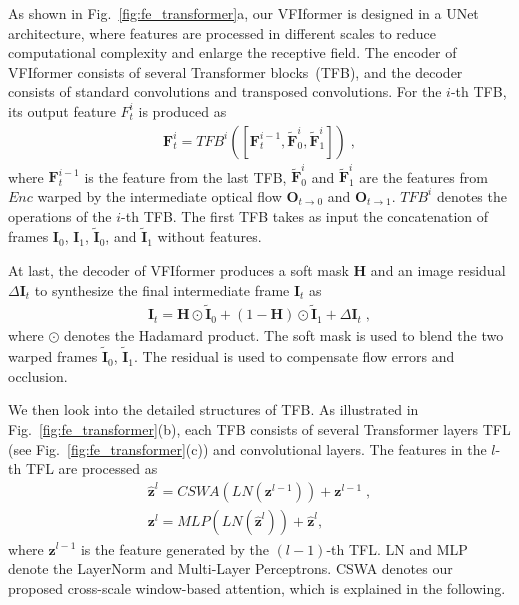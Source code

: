\documentclass[10pt,twocolumn,letterpaper]{article}
\begin{document}
	As shown in Fig.~\ref{fig:fe_transformer}a, our VFIformer is designed in a UNet architecture, where features are processed in different scales to reduce computational complexity and enlarge the receptive field.
	The encoder of VFIformer consists of several Transformer blocks~(TFB), and the decoder consists of standard convolutions and transposed convolutions.
	For the $i$-th TFB, its output feature $F_t^i$ is produced as
	\begin{align}
	\bm{F}_t^i = {TFB}^{i}([\bm{F}_t^{i-1}, \widetilde{\bm{F}}_{0}^{i}, \widetilde{\bm{F}}_{1}^{i}]) \;,
	\end{align}
	where $\bm{F}_t^{i-1}$ is the feature from the last TFB, $\widetilde{\bm{F}}_{0}^{i}$ and $\widetilde{\bm{F}}_{1}^{i}$ are the features from $Enc$ warped by the intermediate optical flow $\bm{O}_{t\rightarrow0}$ and $\bm{O}_{t\rightarrow1}$. ${TFB}^{i}$ denotes the operations of the $i$-th TFB. The first TFB takes as input the concatenation of frames $\bm{I}_0$, $\bm{I}_1$, $\widetilde{\bm{I}}_{0}$, and $\widetilde{\bm{I}}_{1}$ without features. 
	
	At last, the decoder of VFIformer produces a soft mask $\bm{H}$ and an image residual $\Delta \bm{I}_t$ to synthesize the final intermediate frame $\bm{I}_{t}$ as
	\begin{align}
	\bm{I}_{t} = \bm{H} \odot \widetilde{\bm{I}}_{0} + (1-\bm{H}) \odot \widetilde{\bm{I}}_{1} + \Delta{\bm{I}_t} \;,
	\end{align} 
	where $\odot$ denotes the Hadamard product. The soft mask is used to blend the two warped frames $\widetilde{\bm{I}}_{0}$, $\widetilde{\bm{I}}_{1}$. The residual is used to compensate flow errors and occlusion.
	
	
	We then look into the detailed structures of TFB. As illustrated in Fig.~\ref{fig:fe_transformer}(b), each TFB consists of several Transformer layers TFL (see Fig.~\ref{fig:fe_transformer}(c)) and convolutional layers. 
	The features in the $l$-th TFL are processed as
	\begin{align}
	\widehat{\bm{z}}^{l} = CSWA(LN(\bm{z}^{l-1})) + \bm{z}^{l-1} \;, \\
	\bm{z}^{l} = MLP(LN(\widehat{\bm{z}}^{l})) + \widehat{\bm{z}}^{l},
	\end{align}
	where $\bm{z}^{l-1}$ is the feature generated by the $(l-1)$-th TFL. LN and MLP denote the LayerNorm and Multi-Layer Perceptrons. CSWA denotes our proposed cross-scale window-based attention, which is explained in the following.
	
\end{document}
